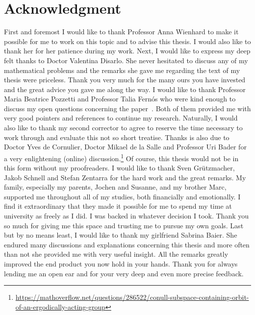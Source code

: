 \clearpage
{}
\markleft{}
\pagestyle{useheadings}
\section*{Acknowledgment}
%
\label{sec:acknowledgement}

First and foremost I would like to thank Professor Anna Wienhard to make it possible for me to work on this topic and to advise this thesis. I would also like to thank her for her patience during my work. Next, I would like to express my deep felt thanks to Doctor Valentina Disarlo. She never hesitated to discuss any of my mathematical problems and the remarks she gave me regarding the text of my thesis were priceless. Thank you very much for the many ours you have invested and the great advice you gave me along the way.
I would like to thank Professor Maria Beatrice Pozzetti and Professor Talia Fernós who were kind enough to discuss my open questions concerning the paper~\cite{MR3509968}. Both of them provided me with very good pointers and references to continue my research. Naturally, I would also like to thank my second corrector to agree to reserve the time necessary to work through and evaluate this not so short treatise.
Thanks is also due to Doctor Yves de Cornulier, Doctor Mikael de la Salle and Professor Uri Bader for a very enlightening (online) discussion.\footnote{\url{https://mathoverflow.net/questions/286522/conull-subspace-containing-orbit-of-an-ergodically-acting-group}} 
Of course, this thesis would not be in this form without my proofreaders. I would like to thank Sven Grützmacher, Jakob Schnell and Stefan Zentarra for the hard work and the great remarks.
My family, especially my parents, Jochen and Susanne, and my brother Marc, supported me throughout all of my studies, both financially and emotionally. I find it extraordinary that they made it possible for me to spend my time at university as freely as I did. I was backed in whatever decision I took. Thank you so much for giving me this space and trusting me to pursue my own goals.
Last but by no means least, I would like to thank my girlfriend Sabrina Baier. She endured many discussions and explanations concerning this thesis and more often than not she provided me with very useful insight. All the remarks greatly improved the end product you now hold in your hands. Thank you for always lending me an open ear and for your very deep and even more precise feedback.

\clearpage
\pagestyle{useheadings}

